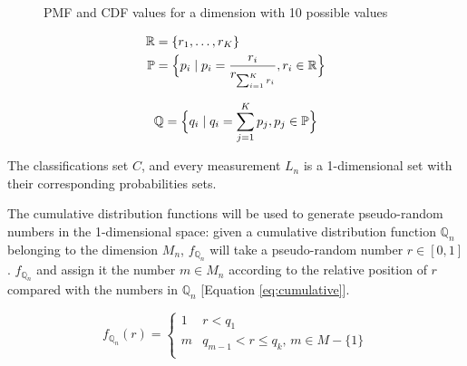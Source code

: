 \documentclass[letterpaper, conference]{IEEEtran}
\begin{document}
\begin{figure}
  \caption{PMF and CDF values for a dimension with 10 possible values}
  \label{fig:pmf-cdf}
\end{figure}

\begin{equation}\label{eq:pmf}
  \begin{aligned}
  \mathbb{R} &= \{r_1, \dots, r_K\} \\
  \mathbb{P} &= \Bigl\{p_i \mid p_i = \frac{r_i}{r_{\sum_{i = 1}^{K} r_i}}, r_i \in \mathbb{R} \Bigr\}
  \end{aligned}
\end{equation}

\begin{equation}\label{eq:cdf}
\mathbb{Q} = \Bigl\{q_i \mid q_i = \sum_{j = 1}^{K} p_j, p_j \in \mathbb{P} \Bigr\}
\end{equation}

The classifications set $C$, and every measurement $L_n$ is a 1-dimensional set with their corresponding probabilities sets.

The cumulative distribution functions will be used to generate pseudo-random numbers in the 1-dimensional space: given a cumulative distribution function $\mathbb{Q}_n$ belonging to the dimension $M_n$, $f_{\mathbb{Q}_n}$ will take a pseudo-random number $r \in [0, 1]$. $f_{\mathbb{Q}_n}$ and assign it the number $m \in M_n$ according to the relative position of $r$ compared with the numbers in $\mathbb{Q}_n$ [Equation \ref{eq:cumulative}].

\begin{equation}\label{eq:cumulative}
  f_{\mathbb{Q}_n}(r) =
  \begin{cases}
  1 & r < q_1 \\
  m & q_{m - 1} < r \leq q_k,\, m \in M - \{1\} \\
  \end{cases}
\end{equation}
\end{document}

